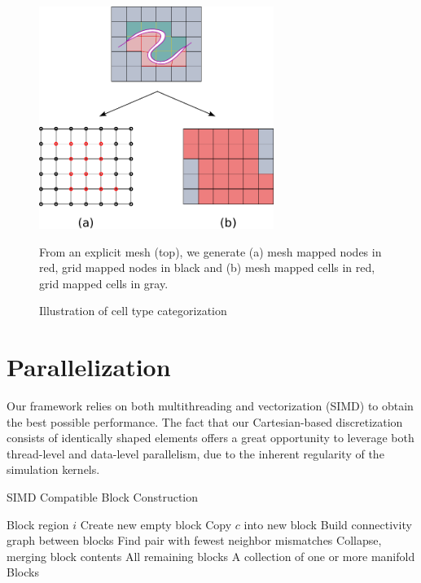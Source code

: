 \begin{figure}
  \centering
\vspace*{-.12in}
  \includegraphics[width=3in]{chapter_gridiron/images/Figure_Topology_D}
\vspace*{-.07in}
  \caption{Illustration of cell type categorization}{From an explicit mesh (top), we generate (a) mesh mapped nodes in red, grid mapped nodes in black and (b) mesh mapped cells in red, grid mapped cells in gray.}
  \label{fig:remapping}
\end{figure}

\section{Parallelization}

Our framework relies on both multithreading and vectorization
(SIMD) to obtain the best possible performance. The fact
that our Cartesian-based discretization consists of identically shaped
elements offers a great opportunity to leverage both thread-level and
data-level parallelism, due to the inherent regularity of the
simulation kernels.

\begin{algorithm}
\caption{SIMD Compatible Block Construction}
\label{alg:BlockGeneration}
\begin{algorithmic}[1]
\Require Block region $i$
    \State Create new empty block
    \State Copy $c$ into new block
  \EndFor
  \State Build connectivity graph between blocks
  \Repeat
      \State Find pair with fewest neighbor mismatches
    \EndFor
      \State Collapse, merging block contents
     \EndIf
  \State \Return All remaining blocks
\EndFunction
\Ensure A collection of one or more manifold Blocks
\end{algorithmic}
\end{algorithm}


